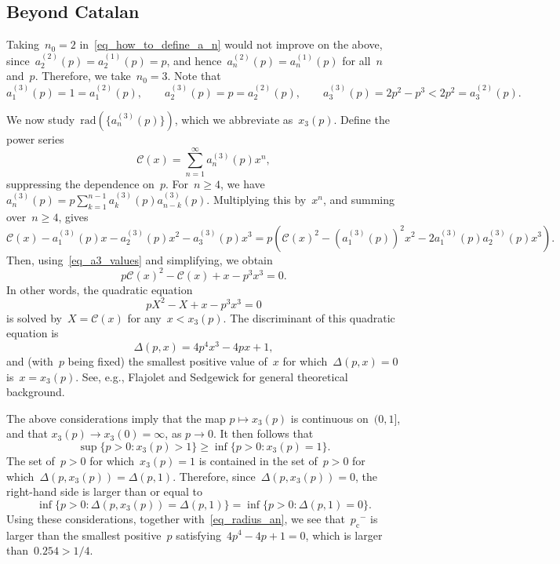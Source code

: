 \documentclass[pdflatex,sn-mathphys-num]{sn-jnl}%
\newcommand{\cC}{\ensuremath{\mathcal C}}
\newcommand{\1}{{\ensuremath{\mathbf{1}}} }
\newcommand{\pc}{\ensuremath{p_{\mathrm{c}} }}
\theoremstyle{thmstyleone}%
\theoremstyle{thmstyletwo}%
\theoremstyle{thmstylethree}%
\begin{document}
\subsection{Beyond Catalan}
\label{S_Catalan+}
Taking~$n_0 = 2$ in~\eqref{eq_how_to_define_a_n} would not improve on the above, since~$a^{(2)}_2(p) = a^{(1)}_2(p) = p$, and hence~$a^{(2)}_n(p) = a^{(1)}_n(p)$ for all~$n$ and~$p$.
Therefore, we take~$n_0 = 3$. Note that
\begin{equation}\label{eq_a3_values}
	a^{(3)}_1(p) = 1 = a^{(2)}_1(p),\qquad a^{(3)}_2(p)  = p = a^{(2)}_2(p),\qquad a^{(3)}_3(p) = 2p^2 - p^3 < 2p^2=  a^{(2)}_3(p). 
\end{equation}

We now study~$\mathrm{rad}(\{a^{(3)}_n(p)\})$, which we abbreviate as~$x_3(p)$.
Define the power series
\[\cC(x) = \sum_{n = 1}^\infty a^{(3)}_n(p) x^{n},\]
suppressing the dependence on~$p$.
For~$n \ge 4$, we have~$a^{(3)}_n(p)=p\sum_{k=1}^{n-1} a^{(3)}_k(p) a^{(3)}_{n-k}(p)$. 
Multiplying this by~$x^n$, and summing over~$n \ge 4$, gives
\[\cC(x) - a^{(3)}_1(p)  x - a^{(3)}_2(p) x^2 - a^{(3)}_3(p) x^3 = p \left( \cC(x)^2 - (a^{(3)}_1(p))^2  x^2 - 2 a^{(3)}_1(p) a^{(3)}_2(p)  x^3\right).\]
Then, using~\eqref{eq_a3_values} and simplifying, we obtain
\[p \cC(x)^2 - \cC(x) + x - p^3 x^3 = 0.\]
In other words, the quadratic equation
\[ pX^2 - X + x - p^3x^3 = 0\]
is solved by~$X = \cC(x)$ for any~$x < x_3(p)$. The discriminant of this quadratic equation is
\[\Delta (p,x) = 4p^4x^3 - 4px + 1,\]
and (with~$p$ being fixed) the smallest positive value of~$x$ for which~$\Delta (p,x) = 0$ is~$x = x_3(p)$. 
See, e.g., 
Flajolet and Sedgewick \cite[Lemma VII.4]{Flajolet09} for general theoretical background. 

The above considerations imply that the map $p\mapsto x_3(p)$ is continuous on~$(0,1]$, and that 
$x_3(p) \to x_3(0) =\infty$, 
as $p \to 0$.  It then follows that
\begin{equation}
	\label{eq_completion1}
\sup\{p > 0: x_3(p) > 1\} \ge \inf\{p > 0: x_3(p) = 1\}.
\end{equation}
The set of~$p > 0$ for which~$x_3(p) = 1$ is contained in the set of~$p > 0$ for which~$\Delta(p,x_3(p)) = \Delta (p,1)$. 
Therefore, since~$\Delta(p,x_3(p)) = 0$, 
the right-hand side is larger than or equal to
\begin{equation}
	\label{eq_completion2}
 \inf\{p > 0: \Delta(p,x_3(p)) = \Delta(p,1)\}=\inf\{p > 0: \Delta(p,1) = 0\}.
\end{equation} 
Using these considerations, together with~\eqref{eq_radius_an}, we see that~$\pc^-$ is larger than the smallest positive~$p$ satisfying~$4p^4-4p+1 = 0$, which is larger than~$0.254 > 1/4$.
\end{document}
